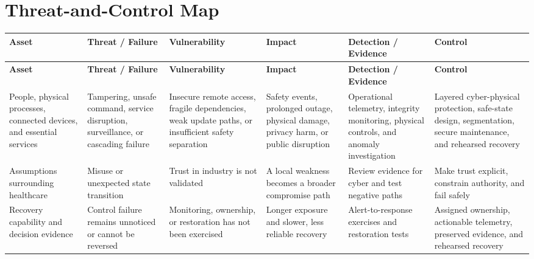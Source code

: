 \documentclass[11pt]{article}
\begin{document}
\section*{Threat-and-Control Map}
\begingroup\scriptsize\setlength{\tabcolsep}{2pt}
\begin{longtable}{>{\RaggedRight\arraybackslash}p{}>{\RaggedRight\arraybackslash}p{}>{\RaggedRight\arraybackslash}p{}>{\RaggedRight\arraybackslash}p{}>{\RaggedRight\arraybackslash}p{}>{\RaggedRight\arraybackslash}p{}}
\toprule\rowcolor{Navy}\color{white}\textbf{Asset} & \color{white}\textbf{Threat / Failure} & \color{white}\textbf{Vulnerability} & \color{white}\textbf{Impact} & \color{white}\textbf{Detection / Evidence} & \color{white}\textbf{Control}\\\midrule
\endfirsthead
\toprule\rowcolor{Navy}\color{white}\textbf{Asset} & \color{white}\textbf{Threat / Failure} & \color{white}\textbf{Vulnerability} & \color{white}\textbf{Impact} & \color{white}\textbf{Detection / Evidence} & \color{white}\textbf{Control}\\\midrule
\endhead
People, physical processes, connected devices, and essential services & Tampering, unsafe command, service disruption, surveillance, or cascading failure & Insecure remote access, fragile dependencies, weak update paths, or insufficient safety separation & Safety events, prolonged outage, physical damage, privacy harm, or public disruption & Operational telemetry, integrity monitoring, physical controls, and anomaly investigation & Layered cyber-physical protection, safe-state design, segmentation, secure maintenance, and rehearsed recovery\\\midrule
Assumptions surrounding healthcare & Misuse or unexpected state transition & Trust in industry is not validated & A local weakness becomes a broader compromise path & Review evidence for cyber and test negative paths & Make trust explicit, constrain authority, and fail safely\\\midrule
Recovery capability and decision evidence & Control failure remains unnoticed or cannot be reversed & Monitoring, ownership, or restoration has not been exercised & Longer exposure and slower, less reliable recovery & Alert-to-response exercises and restoration tests & Assigned ownership, actionable telemetry, preserved evidence, and rehearsed recovery\\\midrule
\bottomrule
\end{longtable}
\endgroup
\end{document}

